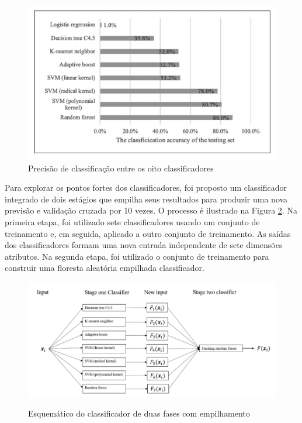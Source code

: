 \begin{figure}[h]
\centering
\caption{Precisão de classificação entre os oito classificadores}
\includegraphics{Template_Latex_TCC-UNIFTEC/_lib/imagens/resultados_facial_skin.png}

\label{fig:x classificacao}
\end{figure}

Para explorar os pontos fortes dos classificadores, foi proposto um classificador integrado de dois estágios que empilha seus resultados para produzir uma nova previsão e validação cruzada por 10 vezes. O processo é ilustrado na Figura \ref{fig:x esquema_classificador}. Na primeira etapa, foi utilizado sete classificadores usando um conjunto de treinamento e, em seguida, aplicado a outro conjunto de treinamento. As saídas dos classificadores formam uma nova entrada independente de sete dimensões atributos.  Na segunda etapa, foi utilizado o conjunto de treinamento para construir uma floresta aleatória empilhada classificador.


\begin{figure}[h]
\centering
\caption{Esquemático do classificador de duas fases com empilhamento }
\includegraphics{Template_Latex_TCC-UNIFTEC/_lib/imagens/classificacao-facial-skin.png}
\label{fig:x esquema_classificador}
\end{figure}


